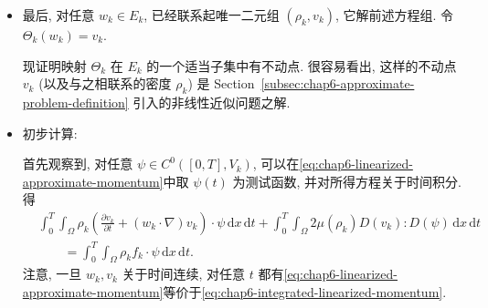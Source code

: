 \begin{sloppypar}
\begin{itemize}
 为证明\eqref{eq:chap6-finite-dimensional-ode}对任意初始数据存在唯一整体解, 只需证明矩阵 $M(t)$ 对任意 $t\in[0,T]$ 可逆, 从而可应用 Cauchy--Lipschitz 理论. 依定义,
 \[
  (M(t))_{ij}=\int_\Omega\rho_k(t,x)\psi_i(x)\cdot\psi_j(x)\,\mathrm dx,
  \qquad\forall i,j\in\{1,\ldots,k\}.
 \]
 因而对任意 $t\in[0,T]$, $M(t)$ 是基 $(\psi_i)_i$ 关于内积
 \[
  (f,g)\longmapsto\langle f,g\rangle_{\rho_k(t)}
  =\int_\Omega\rho_k(t,x)f(x)\cdot g(x)\,\mathrm dx
 \]
 的 Gram 矩阵. 注意, 由\eqref{eq:chap6-approximate-density-lower-bound}, $\langle\cdot,\cdot\rangle_{\rho_k(t)}$ 确为内积. 所以 $M(t)$ 对所有 $t$ 可逆, 从而\eqref{eq:chap6-finite-dimensional-ode}对任意初始数据存在唯一整体解. 于是存在唯一
 $v_k\in v_b+C^1([0,T],V_k)\subset E_k$, 它是\eqref{eq:chap6-linearized-approximate-momentum}的解, 且 $v_k(0)=v_b+\widetilde v_{0,k}$.

 \item 最后, 对任意 $w_k\in E_k$, 已经联系起唯一二元组 $(\rho_k,v_k)$, 它解前述方程组. 令 $\Theta_k(w_k)=v_k$.

 现证明映射 $\Theta_k$ 在 $E_k$ 的一个适当子集中有不动点. 很容易看出, 这样的不动点 $v_k$ (以及与之相联系的密度 $\rho_k$) 是 Section~\ref{subsec:chap6-approximate-problem-definition} 引入的非线性近似问题之解.

 \item 初步计算:

 首先观察到, 对任意 $\psi\in C^0([0,T],V_k)$, 可以在\eqref{eq:chap6-linearized-approximate-momentum}中取 $\psi(t)$ 为测试函数, 并对所得方程关于时间积分. 得
 \begin{equation}
 \begin{aligned}
 &\int_0^T\int_\Omega\rho_k
 \left(\frac{\partial v_k}{\partial t}+(w_k\cdot\nabla)v_k\right)\cdot\psi
 \,\mathrm dx\,\mathrm dt
 +\int_0^T\int_\Omega2\mu(\rho_k)D(v_k):D(\psi)\,\mathrm dx\,\mathrm dt\\
 &\qquad=\int_0^T\int_\Omega\rho_kf_k\cdot\psi\,\mathrm dx\,\mathrm dt.
 \end{aligned}
 \label{eq:chap6-integrated-linearized-momentum}
 \end{equation}
 注意, 一旦 $w_k,v_k$ 关于时间连续, 对任意 $t$ 都有\eqref{eq:chap6-linearized-approximate-momentum}等价于\eqref{eq:chap6-integrated-linearized-momentum}.


\end{itemize}
\end{sloppypar}
